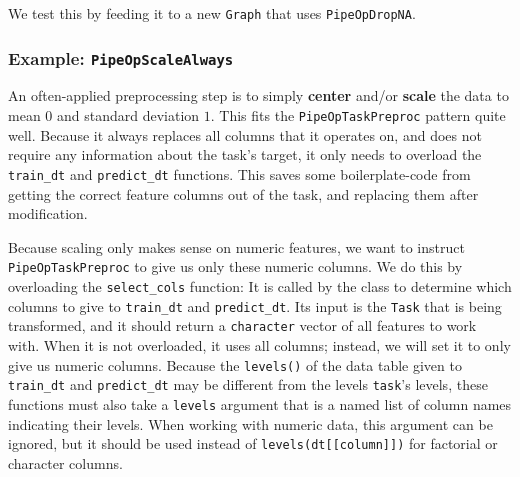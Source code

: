\documentclass[12pt,]{scrbook}
\newenvironment{Shaded}{}{}
\newcommand{\DecValTok}[1]{#1}
\newcommand{\KeywordTok}[1]{\textcolor[rgb]{0.00,0.00,1.00}{#1}}
\newcommand{\NormalTok}[1]{#1}
\newcommand{\OperatorTok}[1]{#1}
\newcommand{\StringTok}[1]{\textcolor[rgb]{0.00,0.50,0.50}{#1}}
\begin{document}
We test this by feeding it to a new \texttt{Graph} that uses \texttt{PipeOpDropNA}.

\begin{Shaded}
\end{Shaded}

\hypertarget{example-pipeopscalealways}{%
\subsubsection{\texorpdfstring{Example: \texttt{PipeOpScaleAlways}}{Example: PipeOpScaleAlways}}\label{example-pipeopscalealways}}

An often-applied preprocessing step is to simply \textbf{center} and/or \textbf{scale} the data to mean \(0\) and standard deviation \(1\).
This fits the \texttt{PipeOpTaskPreproc} pattern quite well.
Because it always replaces all columns that it operates on, and does not require any information about the task's target, it only needs to overload the \texttt{train\_dt} and \texttt{predict\_dt} functions.
This saves some boilerplate-code from getting the correct feature columns out of the task, and replacing them after modification.

Because scaling only makes sense on numeric features, we want to instruct \texttt{PipeOpTaskPreproc} to give us only these numeric columns.
We do this by overloading the \texttt{select\_cols} function: It is called by the class to determine which columns to give to \texttt{train\_dt} and \texttt{predict\_dt}.
Its input is the \texttt{Task} that is being transformed, and it should return a \texttt{character} vector of all features to work with.
When it is not overloaded, it uses all columns; instead, we will set it to only give us numeric columns.
Because the \texttt{levels()} of the data table given to \texttt{train\_dt} and \texttt{predict\_dt} may be different from the levels \texttt{task}'s levels, these functions must also take a \texttt{levels} argument that is a named list of column names indicating their levels.
When working with numeric data, this argument can be ignored, but it should be used instead of \texttt{levels(dt{[}{[}column{]}{]})} for factorial or character columns.
\end{document}

